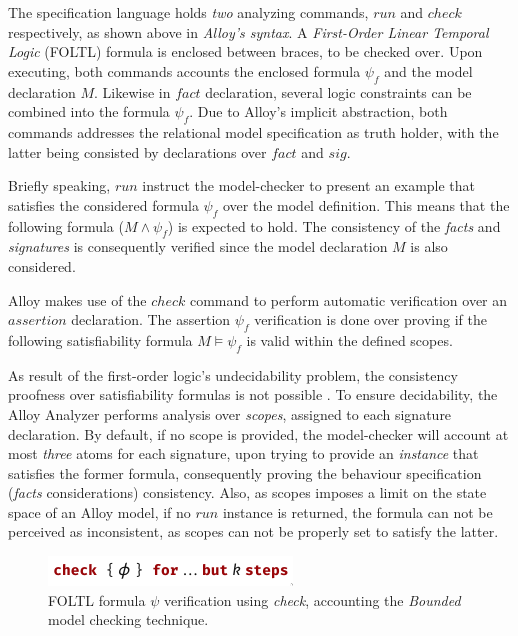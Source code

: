 The specification language holds \textit{two} analyzing commands, $run$ and $check$ respectively, as shown above in \textit{Alloy's syntax}. A \textit{First-Order Linear Temporal Logic} (FOLTL) formula is enclosed between braces, to be checked over. Upon executing, both commands accounts the enclosed formula $\psi_{f}$ and the model declaration ${M}$. Likewise in $fact$ declaration, several logic constraints can be combined into the formula $\psi_{f}$. Due to Alloy's implicit abstraction, both commands addresses the relational model specification as truth holder, with the latter being consisted by declarations over $fact$ and $sig$. 

Briefly speaking, $run$ instruct the model-checker to present an example that satisfies the considered formula $\psi_{f}$ over the model definition. This means that the following formula ($M \wedge \psi_{f}$) is expected to hold. The consistency of the \textit{facts} and \textit{signatures} is consequently verified since the model declaration $M$ is also considered. 

Alloy makes use of the $check$ command to perform automatic verification over an $assertion$ declaration. The assertion $\psi_{f}$ verification is done over proving if the following satisfiability formula $M \models \psi_{f}$ is valid within the defined scopes. %

As result of the first-order logic's undecidability problem, the consistency proofness over satisfiability formulas is not possible \cite{vakili2012temporal}. To ensure decidability, the Alloy Analyzer performs analysis over \textit{scopes}, assigned to each signature declaration. By default, if no scope is provided, the model-checker will account at most \textit{three} atoms for each signature, upon trying to provide an \textit{instance} that satisfies the former formula, consequently proving the behaviour specification (\textit{facts} considerations) consistency. Also, as scopes imposes a limit on the state space of an Alloy model, if no $run$ instance is returned, the formula can not be perceived as inconsistent, as scopes can not be properly set to satisfy the latter.

\begin{figure}[H]
    \centering
    \includegraphics[width=0.4\linewidth]{images/check_alloy_1.png}
    \caption{FOLTL formula $\psi$ verification using \textit{check}, accounting the \textit{Bounded} model checking technique.}
    \label{fig:alloy-check-1}
\end{figure}

